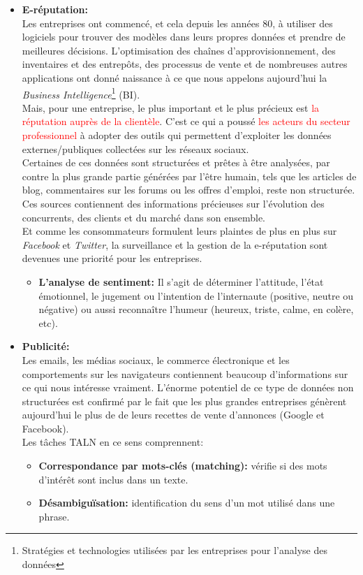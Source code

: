 \begin{itemize}
    \item \textbf{E-réputation:}\\
    Les entreprises ont commencé, et cela depuis les années 80, à utiliser des logiciels pour trouver des modèles dans leurs propres données et prendre de meilleures décisions. L'optimisation des chaînes d'approvisionnement, des inventaires et des entrepôts, des processus de vente et de nombreuses autres applications ont donné naissance à ce que nous appelons aujourd'hui la \emph{Business Intelligence}\footnote{Stratégies et technologies utilisées par les entreprises pour l'analyse des données} (BI).\\ 
    Mais, pour une entreprise, le plus important et le plus précieux est \textcolor{red}{la réputation auprès de la clientèle}. C'est ce qui a poussé \textcolor{red}{les acteurs du secteur professionnel} à adopter des outils qui permettent d'exploiter les données externes/publiques collectées sur les réseaux sociaux.\\
    Certaines de ces données sont structurées et prêtes à être analysées, par contre la plus grande partie générées par l'être humain, tels que les articles de blog, commentaires sur les forums ou les offres d'emploi, reste non structurée. Ces sources contiennent des informations précieuses sur l'évolution des concurrents, des clients et du marché dans son ensemble.\\
    Et comme les consommateurs formulent leurs plaintes de plus en plus sur \emph{Facebook} et \emph{Twitter}, la surveillance et la gestion de la e-réputation sont devenues une priorité pour les entreprises.
    \begin{itemize}
        \item \textbf{L'analyse de sentiment:} Il s'agit de déterminer l'attitude, l'état émotionnel, le jugement ou l'intention de l'internaute (positive, neutre ou négative) ou aussi reconnaître l'humeur (heureux, triste, calme, en colère, etc).\\
    \end{itemize}

    \item \textbf{Publicité:}\\
    Les emails, les médias sociaux, le commerce électronique et les comportements sur les navigateurs contiennent beaucoup d'informations sur ce qui nous intéresse vraiment. L'énorme potentiel de ce type de données non structurées est confirmé par le fait que les plus grandes entreprises génèrent aujourd'hui le plus de de leurs recettes de vente d'annonces (Google et Facebook).\\ Les tâches TALN en ce sens comprennent:
    \begin{itemize}
        \item \textbf{Correspondance par mots-clés (matching):} vérifie si des mots d'intérêt sont inclus dans un texte. 
        \item \textbf{Désambiguïsation:} identification du sens d'un mot utilisé dans une phrase.
    \end{itemize}
\end{itemize}


